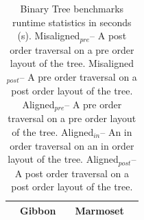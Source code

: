 \documentclass[acmsmall,review,anonymous]{acmart}\settopmatter{printfolios=true,printccs=false,printacmref=false}
\newcommand{\system}{{\sc Marmoset}\xspace}
\newcommand{\alignedPre}{{\sc Aligned$_{\mathit{pre}}$}\xspace}
\newcommand{\alignedIn}{{\sc Aligned$_{\mathit{in}}$}\xspace}
\newcommand{\alignedPost}{{\sc Aligned$_{\mathit{post}}$}\xspace}
\newcommand{\misalignedPost}{{\sc Misaligned$_{\mathit{post}}$}\xspace}
\newcommand{\misalignedPre}{{\sc Misaligned$_{\mathit{pre}}$}\xspace}
\newcommand{\gibbon}{{\sc Gibbon}\xspace}
\newcommand{\ra}[1]{\renewcommand{\arraystretch}{#1}}
\begin{document}
\begin{table}[]
    \small
    \setlength{\tabcolsep}{3.2pt} \centering
    \ra{1}
    \caption
            { Binary Tree benchmarks runtime statistics in seconds (s).
              \misalignedPre -- A post order traversal on a pre order layout of the tree.
              \misalignedPost -- A pre order traversal on a post order layout of the tree.
              \alignedPre -- A pre order traversal on a pre order layout of the tree.
              \alignedIn -- An in order traversal on an in order layout of the tree.
              \alignedPost -- A post order traversal on a post order layout of the tree.
              }
    \begin{tabular}{@{}p{0.6in}rcrcrcrcrcrcrcrcr@{}}\toprule
        & \multicolumn{12}{|c|}{{\gibbon}} &
        & \multicolumn{3}{c|}{{\system}}\\ \midrule



\end{tabular}
\end{table}
\end{document}
